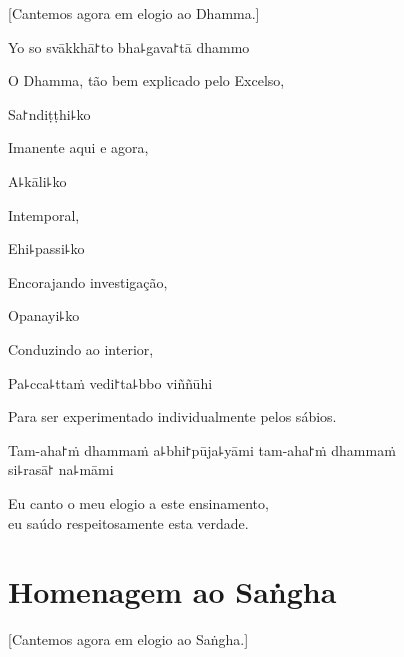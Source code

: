 \begin{english}
  [Cantemos agora em elogio ao Dhamma.]
\end{english}

Yo so svākkhā꜓to bha꜕gava꜓tā dhammo

\begin{english}
  O Dhamma, tão bem explicado pelo Excelso,
\end{english}

Sa꜓ndiṭṭhi꜕ko

\begin{english}
  Imanente aqui e agora,
\end{english}

A꜕kāli꜕ko

\begin{english}
  Intemporal,
\end{english}

Ehi꜕passi꜕ko

\begin{english}
  Encorajando investigação,
\end{english}

Opanayi꜕ko

\begin{english}
  Conduzindo ao interior,
\end{english}

Pa꜕cca꜕ttaṁ vedi꜓ta꜕bbo viññūhi

\begin{english}
  Para ser experimentado individualmente pelos sábios.
\end{english}

Tam-aha꜓ṁ dhammaṁ a꜕bhi꜓pūja꜕yāmi tam-aha꜓ṁ dhammaṁ \\si꜕rasā꜓ na꜕māmi

\begin{english}
  Eu canto o meu elogio a este ensinamento,\\
  eu saúdo respeitosamente esta verdade.
\end{english}

\clearpage

\chapter{Homenagem ao Saṅgha}

\begin{leader}
\end{leader}

\begin{english}
  [Cantemos agora em elogio ao Saṅgha.]
\end{english}

